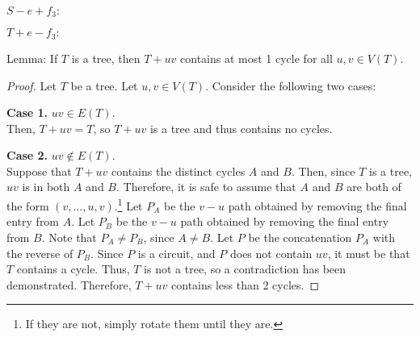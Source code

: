 \documentclass[12pt]{article}
\begin{document}
$S-e+f_3:$
\begin{center}
\end{center}

$T+e-f_3:$
\begin{center}
\end{center}

\newpage{}

Lemma: If $T$ is a tree, then $T+uv$ contains at most 1 cycle for all $u,v \in V(T)$.
\begin{proof}
    Let $T$ be a tree.
    Let $u,v \in V(T)$.
    Consider the following two cases:

    {\bf Case 1.} $uv \in E(T)$. \\
    Then, $T + uv = T$, so $T + uv$ is a tree and thus contains no cycles.

    {\bf Case 2.} $uv \notin E(T)$. \\
    Suppose that $T + uv$ contains the distinct cycles $A$ and $B$.
    Then, since $T$ is a tree, $uv$ is in both $A$ and $B$.
    Therefore, it is safe to assume that $A$ and $B$ are both of the form $(v, \hdots, u, v)$.\footnote{If they are not, simply rotate them until they are.}
    Let $P_A$ be the $v-u$ path obtained by removing the final entry from $A$.
    Let $P_B$ be the $v-u$ path obtained by removing the final entry from $B$.
    Note that $P_A \neq P_B$, since $A \neq B$.
    Let $P$ be the concatenation $P_A$ with the reverse of $P_B$.
    Since $P$ is a circuit, and $P$ does not contain $uv$, it must be that $T$ contains a cycle.
    Thus, $T$ is not a tree, so a contradiction has been demonstrated.
    Therefore, $T+uv$ contains less than 2 cycles.
\end{proof}
\end{document}
